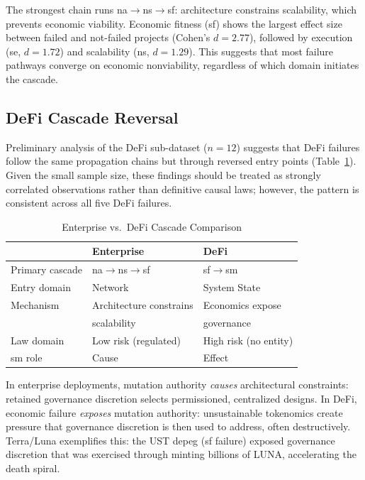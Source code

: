\documentclass[conference]{IEEEtran}
\begin{document}
The strongest chain runs na$\rightarrow$ns$\rightarrow$sf: architecture constrains scalability, which prevents economic viability. Economic fitness (sf) shows the largest effect size between failed and not-failed projects (Cohen's $d = 2.77$), followed by execution (se, $d = 1.72$) and scalability (ns, $d = 1.29$). This suggests that most failure pathways converge on economic nonviability, regardless of which domain initiates the cascade.

\subsection{DeFi Cascade Reversal}

Preliminary analysis of the DeFi sub-dataset ($n=12$) suggests that DeFi failures follow the same propagation chains but through reversed entry points (Table~\ref{tab:defi}). Given the small sample size, these findings should be treated as strongly correlated observations rather than definitive causal laws; however, the pattern is consistent across all five DeFi failures.

\begin{table}[htbp]
\caption{Enterprise vs.\ DeFi Cascade Comparison}
\label{tab:defi}
\centering
\begin{tabular}{lll}
\toprule
& \textbf{Enterprise} & \textbf{DeFi} \\
\midrule
Primary cascade & na$\rightarrow$ns$\rightarrow$sf & sf$\rightarrow$sm \\
Entry domain & Network & System State \\
Mechanism & Architecture constrains & Economics expose \\
& scalability & governance \\
Law domain & Low risk (regulated) & High risk (no entity) \\
sm role & Cause & Effect \\
\bottomrule
\end{tabular}
\end{table}

In enterprise deployments, mutation authority \textit{causes} architectural constraints: retained governance discretion selects permissioned, centralized designs. In DeFi, economic failure \textit{exposes} mutation authority: unsustainable tokenomics create pressure that governance discretion is then used to address, often destructively. Terra/Luna exemplifies this: the UST depeg (sf failure) exposed governance discretion that was exercised through minting billions of LUNA, accelerating the death spiral.
\end{document}
